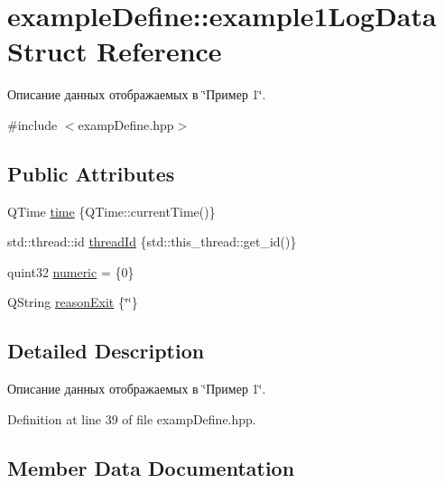 \hypertarget{structexample_define_1_1example1_log_data}{}\section{example\+Define\+:\+:example1\+Log\+Data Struct Reference}
\label{structexample_define_1_1example1_log_data}


Описание данных отображаемых в \char`\"{}Пример 1\char`\"{}.  




{\ttfamily \#include $<$examp\+Define.\+hpp$>$}

\subsection*{Public Attributes}
\begin{DoxyCompactItemize}
\item 
Q\+Time \hyperlink{structexample_define_1_1example1_log_data_adc22e85f6a616c2c3cd77f6dc5488f2e}{time} \{Q\+Time\+::current\+Time()\}
\item 
std\+::thread\+::id \hyperlink{structexample_define_1_1example1_log_data_a2c68cfb8903f6c13c8bf773c1d9b5648}{thread\+Id} \{std\+::this\+\_\+thread\+::get\+\_\+id()\}
\item 
quint32 \hyperlink{structexample_define_1_1example1_log_data_a660f932ce75cea5cf96bcb6c9d31245b}{numeric} = \{0\}
\item 
Q\+String \hyperlink{structexample_define_1_1example1_log_data_ab06b2275453615bf2bedefa73b18b930}{reason\+Exit} \{\char`\"{}\char`\"{}\}
\end{DoxyCompactItemize}


\subsection{Detailed Description}
Описание данных отображаемых в \char`\"{}Пример 1\char`\"{}. 

Definition at line 39 of file examp\+Define.\+hpp.



\subsection{Member Data Documentation}
\mbox{\label{structexample_define_1_1example1_log_data_a660f932ce75cea5cf96bcb6c9d31245b}} 
